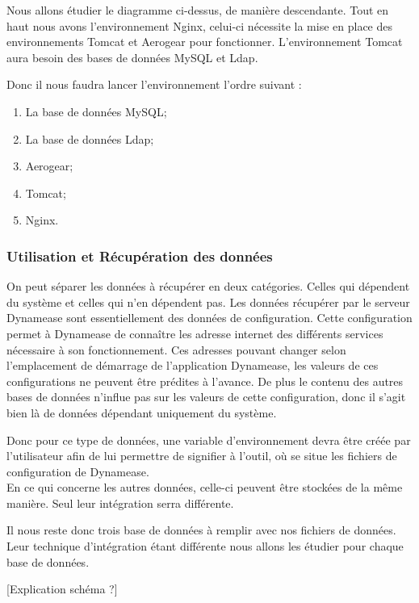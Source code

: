 Nous allons étudier le diagramme ci-dessus, de manière descendante. Tout en haut nous avons l'environnement Nginx, celui-ci nécessite la mise en place des environnements Tomcat et Aerogear pour fonctionner. L'environnement Tomcat aura besoin des bases de données MySQL et Ldap. 

Donc il nous faudra lancer l'environnement l'ordre suivant :

\begin{enumerate}
	\item La base de données MySQL;
	\item La base de données Ldap;
	\item Aerogear;
	\item Tomcat;
	\item Nginx.
\end{enumerate}

\subsubsection{Utilisation et Récupération des données}

On peut séparer les données à récupérer en deux catégories. Celles qui dépendent du système et celles qui n'en dépendent pas. Les données récupérer par le serveur Dynamease sont essentiellement des données de configuration. Cette configuration permet à Dynamease de connaître les adresse internet des différents services nécessaire à son fonctionnement. Ces adresses pouvant changer selon l'emplacement de démarrage de l'application Dynamease, les valeurs de ces configurations ne peuvent être prédites à l'avance. De plus le contenu des autres bases de données n'influe pas sur les valeurs de cette configuration, donc il s'agit bien là de données dépendant uniquement du système. 

Donc pour ce type de données, une variable d'environnement devra être créée par l'utilisateur afin de lui permettre de signifier à l'outil, où se situe les fichiers de configuration de Dynamease.\\

En ce qui concerne les autres données, celle-ci peuvent être stockées de la même manière. Seul leur intégration serra différente.

Il nous reste donc trois base de données à remplir avec nos fichiers de données. Leur technique d'intégration étant différente nous allons les étudier pour chaque base de données. 

[Explication schéma ?] 

